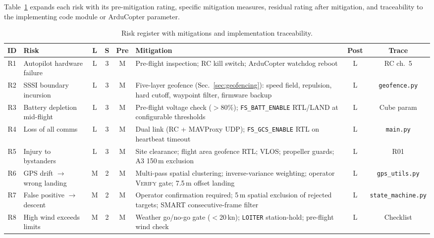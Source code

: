 Table~\ref{tab:risk-register} expands each risk with its pre-mitigation rating, specific mitigation measures, residual rating after mitigation, and traceability to the implementing code module or ArduCopter parameter.

\begin{table}[htbp]
\centering
\caption{Risk register with mitigations and implementation traceability.}
\label{tab:risk-register}
\small
\begin{tabular}{clcccp{4.8cm}cc}
\toprule
\textbf{ID} & \textbf{Risk} & \textbf{L} & \textbf{S} & \textbf{Pre} & \textbf{Mitigation} & \textbf{Post} & \textbf{Trace} \\
\midrule
R1 & Autopilot hardware failure & L & 3 & \cellcolor{yellow!30}M & Pre-flight inspection; RC kill switch; ArduCopter watchdog reboot & \cellcolor{green!20}L & RC ch.~5 \\
R2 & SSSI boundary incursion & L & 3 & \cellcolor{yellow!30}M & Five-layer geofence (Sec.~\ref{sec:geofencing}): speed field, repulsion, hard cutoff, waypoint filter, firmware backup & \cellcolor{green!20}L & \texttt{geofence.py} \\
R3 & Battery depletion mid-flight & L & 3 & \cellcolor{yellow!30}M & Pre-flight voltage check ($>$80\%); \texttt{FS\_BATT\_ENABLE} RTL/LAND at configurable thresholds & \cellcolor{green!20}L & Cube param \\
R4 & Loss of all comms & L & 3 & \cellcolor{yellow!30}M & Dual link (RC + MAVProxy UDP); \texttt{FS\_GCS\_ENABLE} RTL on heartbeat timeout & \cellcolor{green!20}L & \texttt{main.py} \\
R5 & Injury to bystanders & L & 3 & \cellcolor{yellow!30}M & Site clearance; flight area geofence RTL; VLOS; propeller guards; A3 150\,m exclusion & \cellcolor{green!20}L & R01 \\
R6 & GPS drift $\to$ wrong landing & M & 2 & \cellcolor{yellow!30}M & Multi-pass spatial clustering; inverse-variance weighting; operator \textsc{Verify} gate; 7.5\,m offset landing & \cellcolor{green!20}L & \texttt{gps\_utils.py} \\
R7 & False positive $\to$ descent & M & 2 & \cellcolor{yellow!30}M & Operator confirmation required; 5\,m spatial exclusion of rejected targets; SMART consecutive-frame filter & \cellcolor{green!20}L & \texttt{state\_machine.py} \\
R8 & High wind exceeds limits & M & 2 & \cellcolor{yellow!30}M & Weather go/no-go gate ($<$20\,kn); \texttt{LOITER} station-hold; pre-flight wind check & \cellcolor{green!20}L & Checklist \\

\end{tabular}
\end{table}
